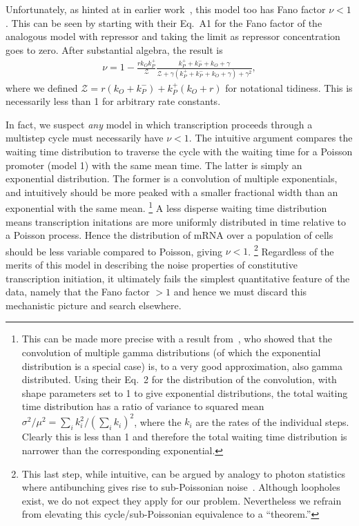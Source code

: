 Unfortunately, as hinted at in earlier work~\cite{Mitarai2015}, this model too
has Fano factor $\nu<1$. This can be seen by starting with their Eq.~A1 for the
Fano factor of the analogous model with repressor and taking the limit as
repressor concentration goes to zero. After substantial algebra, the result is
\begin{align}
\nu = 1 - \frac{r k_O k_P^+}{\mathcal{Z}}
\frac{k_P^+ + k_P^- + k_O + \gamma}
        {\mathcal{Z} + \gamma(k_P^+ + k_P^- + k_O + \gamma) + \gamma^2},
\end{align}
where we defined $\mathcal{Z} = r(k_O + k_P^-) + k_P^+(k_O + r)$ for notational
tidiness. This is necessarily less than 1 for arbitrary rate constants.

In fact, we suspect \textit{any} model in which transcription proceeds through a
multistep cycle must necessarily have $\nu<1$. The intuitive argument compares
the waiting time distribution to traverse the cycle with the waiting time for a
Poisson promoter (model 1) with the same mean time. The latter is simply an
exponential distribution. The former is a convolution of multiple exponentials,
and intuitively should be more peaked with a smaller fractional width than an
exponential with the same mean.
\footnote{This can be made more precise with a result from~\cite{Stewart2007},
who showed that the convolution of multiple gamma distributions (of which the
exponential distribution is a special case) is, to a very good approximation,
also gamma distributed. Using their Eq.~2 for the distribution of the
convolution, with shape parameters set to 1 to give exponential distributions,
the total waiting time distribution has a ratio of variance to squared mean
$\sigma^2/\mu^2 = \sum_i k_i^2/\left(\sum_i k_i\right)^2$, where the $k_i$ are
the rates of the individual steps. Clearly this is less than 1 and therefore the
total waiting time distribution is narrower than the corresponding exponential.}
A less disperse waiting time distribution means transcription initations are
more uniformly distributed in time relative to a Poisson process. Hence the
distribution of mRNA over a population of cells should be less variable compared
to Poisson, giving $\nu<1$.
\footnote{This last step, while intuitive, can be argued by analogy to photon
statistics where antibunching gives rise to sub-Poissonian noise~\cite{Paul1982,
Zou1990}. Although loopholes exist, we do not expect they apply for our problem.
Nevertheless we refrain from elevating this cycle/sub-Poissonian equivalence to
a ``theorem.'' }
Regardless of the merits of this model in describing the noise properties of
constitutive transcription initiation, it ultimately fails the simplest
quantitative feature of the data, namely that the Fano factor $> 1$ and hence
we must discard this mechanistic picture and search elsewhere.

